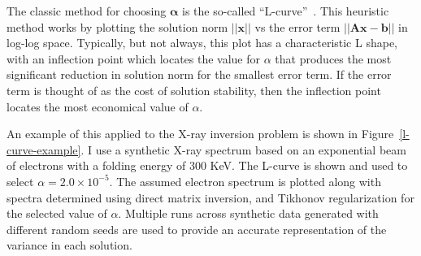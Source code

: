 The classic method for choosing $\mathbf{\alpha}$ is the so-called ``L-curve''~\citep{Hanke1996,Hansen1992,Hansen1993}. This heuristic method works by plotting the solution norm $\vert\vert \mathbf{x} \vert\vert$ vs the error term $\vert \vert \mathbf{A}\mathbf{x} - \mathbf{b} \vert \vert$ in log-log space. Typically, but not always, this plot has a characteristic L shape, with an inflection point which locates the value for $\alpha$ that produces the most significant reduction in solution norm for the smallest error term. If the error term is thought of as the cost of solution stability, then the inflection point locates the most economical value of $\alpha$. 

An example of this applied to the X-ray inversion problem is shown in Figure~\ref{l-curve-example}. I use a synthetic X-ray spectrum based on an exponential beam of electrons with a folding energy of 300 KeV. The L-curve is shown and used to select $\alpha = 2.0\times10^{-5}$. The assumed electron spectrum is plotted along with spectra determined using direct matrix inversion, and Tikhonov regularization for the selected value of $\alpha$. Multiple runs across synthetic data generated with different random seeds are used to provide an accurate representation of the variance in each solution. 


